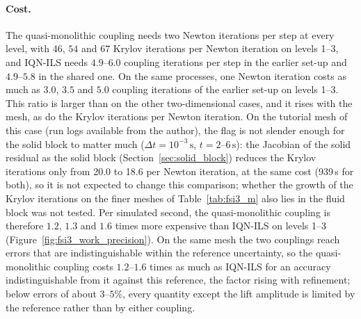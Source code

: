 \paragraph{Cost.}
The quasi-monolithic coupling needs two Newton iterations per step at every level, with $46$, $54$ and $67$ Krylov iterations per Newton iteration on levels 1--3, and IQN-ILS needs $4.9$--$6.0$ coupling iterations per step in the earlier set-up and $4.9$--$5.8$ in the shared one.
On the same processes, one Newton iteration costs as much as $3.0$, $3.5$ and $5.0$ coupling iterations of the earlier set-up on levels 1--3.
This ratio is larger than on the other two-dimensional cases, and it rises with the mesh, as do the Krylov iterations per Newton iteration.
On the tutorial mesh of this case (run logs available from the author), the flag is not slender enough for the solid block to matter much ($\Delta t = 10^{-3}\,\mathrm{s}$, $t = 2$--$6\,\mathrm{s}$): the Jacobian of the solid residual as the solid block (Section~\ref{sec:solid_block}) reduces the Krylov iterations only from 20.0 to 18.6 per Newton iteration, at the same cost (939\,s for both), so it is not expected to change this comparison; whether the growth of the Krylov iterations on the finer meshes of Table~\ref{tab:fsi3_m} also lies in the fluid block was not tested.
Per simulated second, the quasi-monolithic coupling is therefore $1.2$, $1.3$ and $1.6$ times more expensive than IQN-ILS on levels 1--3 (Figure~\ref{fig:fsi3_work_precision}).
On the same mesh the two couplings reach errors that are indistinguishable within the reference uncertainty, so the quasi-monolithic coupling costs $1.2$--$1.6$ times as much as IQN-ILS for an accuracy indistinguishable from it against this reference, the factor rising with refinement; below errors of about $3$--$5\%$, every quantity except the lift amplitude is limited by the reference rather than by either coupling.

